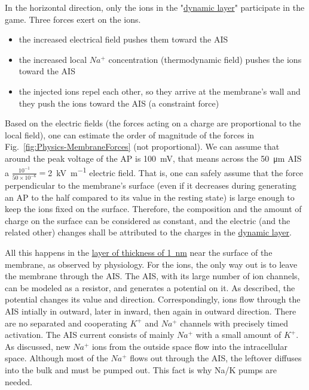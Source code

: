 	
In the horizontal direction, only the ions in the 
"\hyperlink{DynamicLayer}{dynamic layer}" participate in the game.
Three forces exert on the ions. 
\begin{itemize}
	\item the increased electrical field pushes them 
	toward the AIS
	\item the increased local $Na^+$ concentration (thermodynamic field) pushes the ions toward the \gls{AIS}
	\item the injected ions repel each other, so they arrive at the membrane's wall and they push the 
	ions toward the \gls{AIS} (a constraint force)
\end{itemize}

Based on the electric fields (the forces acting on a charge
are proportional to the local field), one can estimate the
order of magnitude of the forces in Fig.~\ref{fig:Physics-MembraneForces} (not proportional). 
We can assume that around the peak voltage of the \gls{AP} is \SI{100}{\milli\volt}, that means across the \SI{50}{\micro\meter} \gls{AIS}
a $\frac{10^{-1}}{50\times 10^{-6}}=$\SI{2}{\kilo\volt\per\meter} electric field. That is, one can safely assume that the force
perpendicular to the membrane's surface (even if it decreases
during generating an \gls{AP} 
to the half compared to its value in the resting state) is large enough 
to keep the ions fixed on the surface. Therefore, the 
composition and the amount of charge on the surface can be considered 
as constant, and the electric (and the related other) changes shall be
attributed to the charges in the \hyperlink{DynamicLayer}{dynamic layer}.


All this happens in the \hyperlink{DynamicLayer}{layer of thickness of 1~nm} near the
surface of the membrane, as observed by physiology. For the ions, the only way out is to leave the membrane through the
\gls{AIS}. The \gls{AIS}, with its large number of ion channels,
can be modeled as a resistor, and generates a potential on it. As described, the potential changes its value and direction. Correspondingly, ions flow through the \gls{AIS}
intially in outward, later in inward, then again in outward direction. There are no separated and cooperating $K^+$ and $Na^+$ channels with precisely timed activation. The \gls{AIS} current consists of mainly $Na^+$ with a small amount of $K^+$. 
As discussed, new $Na^+$ ions from the outside space flow into
the intracellular space. Although most of the $Na^+$ flows out through the \gls{AIS}, the leftover diffuses into the bulk and must be pumped out.
This fact is why Na/K pumps are needed.

